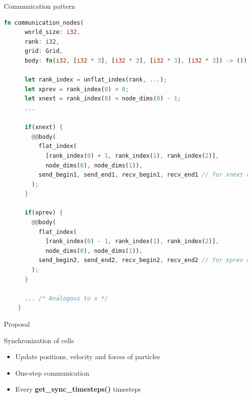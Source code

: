 \documentclass[aspectratio=43,t]{beamer}
\begin{document}
  \begin{frame}[fragile]{Communication pattern}
    \begin{lstlisting}[basicstyle=\tiny\ttfamily,language=Rust]
    fn communication_nodes(
      world_size: i32,
      rank: i32,
      grid: Grid,
      body: fn(i32, [i32 * 3], [i32 * 3], [i32 * 3], [i32 * 3]) -> ()) -> () {

      let rank_index = unflat_index(rank, ...);
      let xprev = rank_index(0) > 0;
      let xnext = rank_index(0) < node_dims(0) - 1;
      ...

      if(xnext) {
        @@body(
          flat_index(
            [rank_index(0) + 1, rank_index(1), rank_index(2)],
            node_dims(0), node_dims(1)),
          send_begin1, send_end1, recv_begin1, recv_end1 // for xnext communication
        );     
      }

      if(xprev) {
        @@body(
          flat_index(
            [rank_index(0) - 1, rank_index(1), rank_index(2)],
            node_dims(0), node_dims(1)),
          send_begin2, send_end2, recv_begin2, recv_end2 // for xprev communication
        );     
      }

      ... /* Analogous to x */
    }
    \end{lstlisting}
  \end{frame}

  \begin{frame}{Proposal}
    \begin{block}{Synchronization of cells}
      \begin{itemize}
        \item Update positions, velocity and forces of particles
        \item One-step communication
        \item Every \textbf{get\_sync\_timesteps()} timesteps
      \end{itemize}
    \end{block}
  \end{frame}
\end{document}
